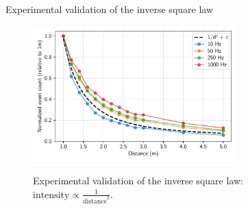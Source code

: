 \documentclass{beamer}
\begin{document}
\begin{frame}{Experimental validation of the inverse square law}

    \begin{figure}
        \centering
        \includegraphics[width=0.70\textwidth]{../fig/pgfplot/build/inv_square2.pdf}
        \label{fig:fit1}
        \caption{Experimental validation of the inverse square law: \scriptsize{$\text{intensity} \propto \frac{1}{\text{distance}^2}$}.}
    \end{figure}


\end{frame}

\end{document}
